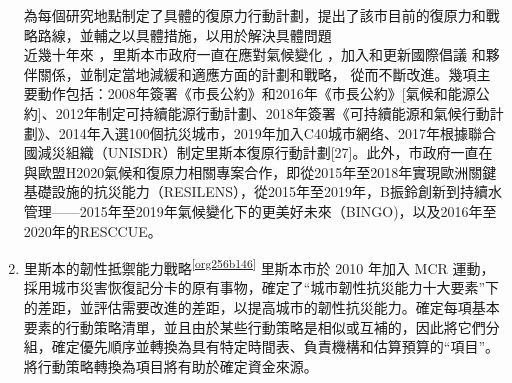 \documentclass[a4paper,12pt]{article}
\begin{document}
\begin{enumerate}
為每個研究地點制定了具體的復原力行動計劃，提出了該市目前的復原力和戰略路線，並輔之以具體措施，以用於解決具體問題\\

近幾十年來 ，里斯本市政府一直在應對氣候變化 ，加入和更新國際倡議 和夥伴關係，並制定當地減緩和適應方面的計劃和戰略， 從而不斷改進。幾項主要動作包括：2008年簽署《市長公約》和2016年《市長公約》[氣候和能源公約]、2012年制定可持續能源行動計劃、2018年簽署《可持續能源和氣候行動計劃》、2014年入選100個抗災城市，2019年加入C40城市網络、2017年根據聯合國減災組織（UNISDR）制定里斯本復原行動計劃[27]。此外，市政府一直在與歐盟H2020氣候和復原力相關專案合作，即從2015年至2018年實現歐洲關鍵基礎設施的抗災能力（RESILENS），從2015年至2019年，B振鈴創新到持續水管理——2015年至2019年氣候變化下的更美好未來（BINGO)，以及2016年至2020年的RESCCUE。\\
\item 里斯本的韌性抵禦能力戰略\textsuperscript{\ref{org256b146}}
\label{sec:orgec1ea40}
里斯本市於 2010 年加入 MCR 運動，採用城市災害恢復記分卡的原有事物，確定了“城市韌性抗災能力十大要素”下的差距，並評估需要改進的差距，以提高城市的韌性抗災能力。確定每項基本要素的行動策略清單，並且由於某些行動策略是相似或互補的，因此將它們分組，確定優先順序並轉換為具有特定時間表、負責機構和估算預算的“項目”。將行動策略轉換為項目將有助於確定資金來源。\\


\end{enumerate}
\end{document}
